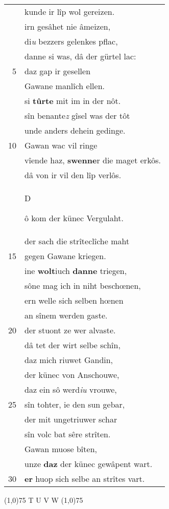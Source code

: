 \documentclass[8pt,a4paper,notitlepage]{article}
\begin{document}
\begin{table}[ht]
\begin{minipage}[t]{0.5\linewidth}
\begin{tabular}{rl}
 & kunde ir lîp wol gereizen.\\ 
 & irn gesâhet nie âmeizen,\\ 
 & di\textit{u} bezzers gelenkes pflac,\\ 
 & danne si was, dâ der gürtel lac:\\ 
5 & daz gap ir gesellen\\ 
 & Gawane manlîch ellen.\\ 
 & si \textbf{tûrte} mit im in der nôt.\\ 
 & sîn benante\textit{z} gîsel was der tôt\\ 
 & unde anders dehein gedinge.\\ 
10 & Gawan wac vil ringe\\ 
 & vîende haz, \textbf{swenne}r die maget erkôs.\\ 
 & dâ von ir vil den lîp verlôs.\\ 
 & \begin{large}D\end{large}ô kom der künec Vergulaht.\\ 
 & der sach die strîteclîche maht\\ 
15 & gegen Gawane kriegen.\\ 
 & ine \textbf{wolt}iuch \textbf{danne} triegen,\\ 
 & sône mag ich in niht beschœnen,\\ 
 & ern welle sich selben hœnen\\ 
 & an sînem werden gaste.\\ 
20 & der stuont ze wer alvaste.\\ 
 & dâ tet der wirt selbe schîn,\\ 
 & daz mich riuwet Gandin,\\ 
 & der künec von Anschouwe,\\ 
 & daz ein sô werd\textit{iu} vrouwe,\\ 
25 & sîn tohter, ie den sun gebar,\\ 
 & der mit ungetriuwer schar\\ 
 & sîn volc bat sêre strîten.\\ 
 & Gawan muose bîten,\\ 
 & unze \textbf{daz} der künec gewâpent wart.\\ 
30 & \textbf{er} huop sich selbe an strîtes vart.\\ 
\end{tabular}
\scriptsize
\line(1,0){75} \newline
T U V W \newline
\line(1,0){75} \newline

\end{minipage}
\end{table}
\end{document}
